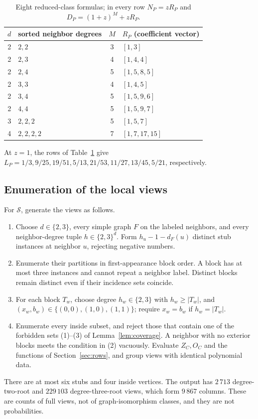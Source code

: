 \documentclass[11pt]{article}
\begin{document}
\begin{table}[ht]
\centering\small
\begin{tabular}{clcl}\toprule
$d$ & sorted neighbor degrees & $M$ & $R_P$ (coefficient vector)\\\midrule
2 & $2,2$ &3&$[1,3]$\\
2 & $2,3$ &4&$[1,4,4]$\\
2 & $2,4$ &5&$[1,5,8,5]$\\
2 & $3,3$ &4&$[1,4,5]$\\
2 & $3,4$ &5&$[1,5,9,6]$\\
2 & $4,4$ &5&$[1,5,9,7]$\\
3 & $2,2,2$ &5&$[1,5,7]$\\
4 & $2,2,2,2$ &7&$[1,7,17,15]$\\\bottomrule
\end{tabular}
\caption{Eight reduced-class formulas; in every row $N_P=zR_P$ and $D_P=(1+z)^M+zR_P$.}\label{tab:reducedpatterns}
\end{table}

At $z=1$, the rows of Table~\ref{tab:reducedpatterns} give $L_P=1/3,\allowbreak9/25,\allowbreak19/51,\allowbreak5/13,\allowbreak21/53,\allowbreak11/27,\allowbreak13/45,\allowbreak5/21$, respectively.


\FloatBarrier
\subsection{Enumeration of the local views}
For $\mathcal S$, generate the views as follows.
\begin{enumerate}[itemsep=3pt]
\item Choose $d\in\{2,3\}$, every simple graph $F$ on the labeled neighbors, and every neighbor-degree tuple $h\in\{2,3\}^d$. Form $h_u-1-d_F(u)$ distinct stub instances at neighbor $u$, rejecting negative numbers.
\item Enumerate their partitions in first-appearance block order. A block has at most three instances and cannot repeat a neighbor label. Distinct blocks remain distinct even if their incidence sets coincide.
\item For each block $T_w$, choose degree $h_w\in\{2,3\}$ with $h_w\ge|T_w|$, and $(x_w,b_w)\in\{(0,0),(1,0),(1,1)\}$; require $x_w=b_w$ if $h_w=|T_w|$.
\item Enumerate every inside subset, and reject those that contain one of the forbidden sets (1)--(3) of Lemma~\ref{lem:coverage}. A neighbor with no exterior blocks meets the condition in (2) vacuously. Evaluate $Z_C,O_C$ and the functions of Section~\ref{sec:rows}, and group views with identical polynomial data.
\end{enumerate}
There are at most six stubs and four inside vertices. The output has $2\,713$ degree-two-root and $229\,103$ degree-three-root views, which form $9\,867$ columns. These are counts of full views, not of graph-isomorphism classes, and they are not probabilities.
\end{document}
